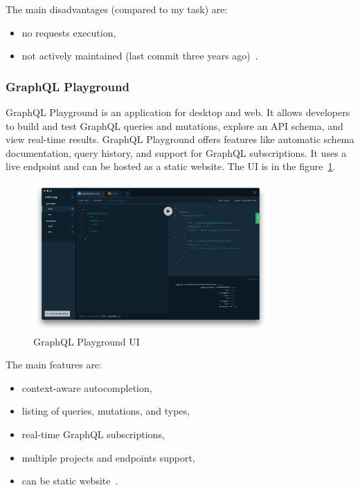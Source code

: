 The main disadvantages (compared to my task) are:
\begin{itemize}
    \item no requests execution,
    \item not actively maintained (last commit three years ago)~\cite{graphql-graphql-playground}.
\end{itemize}

\subsubsection{GraphQL Playground}
GraphQL Playground is an application for desktop and web.
It allows developers to build and test GraphQL queries and mutations, explore an API schema, and view real-time results.
GraphQL Playground offers features like automatic schema documentation, query history, and support for GraphQL subscriptions.
It uses a live endpoint and can be hosted as a static website.
The UI is in the figure~\ref{fig:graphql-graphql-playground}.
\cite{graphql-graphql-playground}

\begin{figure}[hbt!]
    \centering
    \captionsetup{justification=centering}
    \includegraphics[width=0.8\textwidth]{images/graphql/graphql-playground}
    \caption{GraphQL Playground UI~\cite{graphql-graphql-playground}}
    \label{fig:graphql-graphql-playground}
\end{figure}

The main features are:
\begin{itemize}
    \item context-aware autocompletion,
    \item listing of queries, mutations, and types,
    \item real-time GraphQL subscriptions,
    \item multiple projects and endpoints support,
    \item can be static website~\cite{graphql-graphql-playground}.
\end{itemize}

